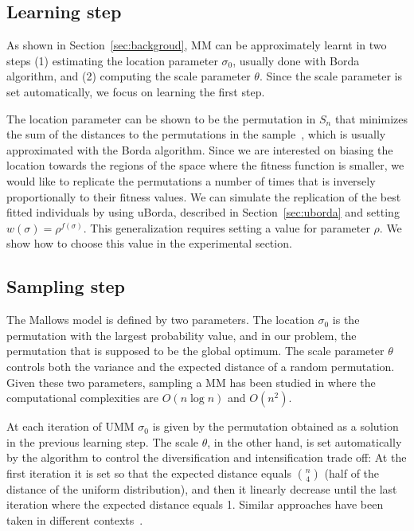 \documentclass[runningheads]{llncs}
\begin{document}
\subsection{Learning step}\label{sec:learning}

As shown in Section~\ref{sec:backgroud}, MM can be approximately learnt in two steps (1) estimating the location parameter $\sigma_0$, usually done with Borda algorithm, and (2) computing the scale parameter $\theta$. Since the scale parameter is set automatically, we focus on learning the first step. 

The location parameter can be shown to be the permutation in $S_n$ that minimizes the sum of the distances to the permutations in the sample~\cite{gMallows}, which is usually approximated with the Borda algorithm. Since we are interested on biasing the location towards the regions of the space where the fitness function is smaller, we would like to replicate the permutations a number of times that is inversely proportionally to their fitness values.
We can simulate the replication of the best fitted individuals by using uBorda, described in Section~\ref{sec:uborda} and setting $w(\sigma)=\rho^{f(\sigma)}$. This generalization requires setting a value for parameter $\rho$. We show how to choose this value in the experimental section. 


\subsection{Sampling step}
The Mallows model is defined by two parameters. The location $\sigma_0$ is the permutation with the largest probability value, and in our problem, the permutation that is supposed to be the global optimum. The scale parameter $\theta$ controls both the variance and the expected distance of a random permutation. Given these two parameters, sampling a MM has been studied in \cite{Collas}\cite{Irurozki2016b}\cite{Regenwetter2004} where the computational complexities are $O(n\log n)$ and $O(n^2)$.


At each iteration of UMM $\sigma_0$ is given by the permutation obtained as a solution in the previous learning step. The scale $\theta$, in the other hand, is set automatically by the algorithm to control the diversification and intensification trade off: At the first iteration it is set so that the expected distance equals  ${n\choose 4}$ (half of the distance of the uniform distribution), and then it linearly decrease until the last iteration where the expected distance equals 1. Similar approaches have been taken in different contexts~\cite{arza2019approaching}.
\end{document}
